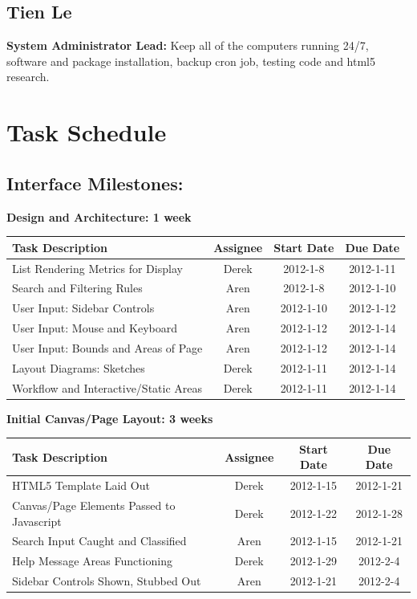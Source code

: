 \documentclass[12pt, letterpaper]{article}
\begin{document}
  \subsection{Tien Le}
  {\bf System Administrator Lead:} Keep all of the computers running 24/7, software and package installation, backup cron job, testing code and html5 research. 

\section{Task Schedule}
	\subsection{Interface Milestones:}

  \begin{center}
		{\bf Design and Architecture: 1 week}
    \begin{tabular}{| l || c | c | c | }
      \hline
      Task Description & Assignee & Start Date & Due Date \\
      \hline
	    List Rendering Metrics for Display & Derek & 2012-1-8 & 2012-1-11 \\
	    Search and Filtering Rules & Aren & 2012-1-8 & 2012-1-10 \\
	    User Input: Sidebar Controls & Aren & 2012-1-10 & 2012-1-12 \\
			User Input: Mouse and Keyboard & Aren & 2012-1-12 & 2012-1-14 \\
	    User Input: Bounds and Areas of Page & Aren & 2012-1-12 & 2012-1-14 \\
	    Layout Diagrams: Sketches & Derek & 2012-1-11 & 2012-1-14 \\
	    Workflow and Interactive/Static Areas & Derek & 2012-1-11 & 2012-1-14 \\
      \hline
    \end{tabular}
  \end{center}

  \begin{center}
		{\bf Initial Canvas/Page Layout: 3 weeks}
    \begin{tabular}{| l || c | c | c | }
      \hline
      Task Description & Assignee & Start Date & Due Date \\
      \hline
	    HTML5 Template Laid Out & Derek & 2012-1-15 & 2012-1-21 \\
	    Canvas/Page Elements Passed to Javascript & Derek & 2012-1-22 & 2012-1-28 \\
	    Search Input Caught and Classified & Aren & 2012-1-15 & 2012-1-21 \\
	    Help Message Areas Functioning & Derek & 2012-1-29 & 2012-2-4 \\
	    Sidebar Controls Shown, Stubbed Out & Aren & 2012-1-21 & 2012-2-4 \\
      \hline
    \end{tabular}
  \end{center}
\end{document}
